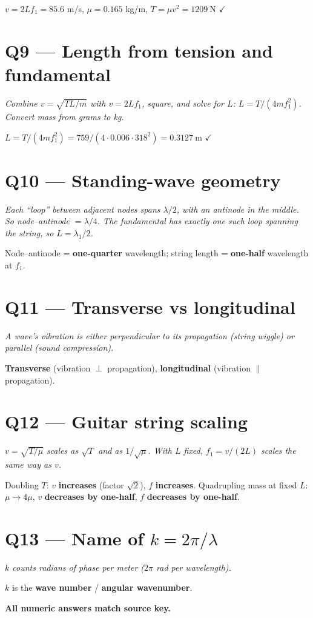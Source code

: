 \documentclass[11pt]{article}
\newcommand{\checkmk}{\ensuremath{\checkmark}}
\begin{document}
$v = 2Lf_1 = 85.6$ m/s, $\mu = 0.165$ kg/m, $T = \mu v^2 = \boxed{1209\ \text{N}}$ \checkmk

\section*{Q9 --- Length from tension and fundamental}
\emph{Combine $v = \sqrt{TL/m}$ with $v = 2Lf_1$, square, and solve for $L$: $L = T/(4 m f_1^2)$. Convert mass from grams to kg.}

$L = T/(4mf_1^2) = 759/(4\cdot 0.006\cdot 318^2) = \boxed{0.3127\ \text{m}}$ \checkmk

\section*{Q10 --- Standing-wave geometry}
\emph{Each ``loop'' between adjacent nodes spans $\lambda/2$, with an antinode in the middle. So node--antinode $= \lambda/4$. The fundamental has exactly one such loop spanning the string, so $L = \lambda_1/2$.}

Node--antinode = \textbf{one-quarter} wavelength; string length = \textbf{one-half} wavelength at $f_1$.

\section*{Q11 --- Transverse vs longitudinal}
\emph{A wave's vibration is either perpendicular to its propagation (string wiggle) or parallel (sound compression).}

\textbf{Transverse} (vibration $\perp$ propagation), \textbf{longitudinal} (vibration $\parallel$ propagation).

\section*{Q12 --- Guitar string scaling}
\emph{$v = \sqrt{T/\mu}$ scales as $\sqrt{T}$ and as $1/\sqrt{\mu}$. With $L$ fixed, $f_1 = v/(2L)$ scales the same way as $v$.}

Doubling $T$: $v$ \textbf{increases} (factor $\sqrt2$), $f$ \textbf{increases}. Quadrupling mass at fixed $L$: $\mu \to 4\mu$, $v$ \textbf{decreases by one-half}, $f$ \textbf{decreases by one-half}.

\section*{Q13 --- Name of $k = 2\pi/\lambda$}
\emph{$k$ counts radians of phase per meter ($2\pi$ rad per wavelength).}

$k$ is the \textbf{wave number} / \textbf{angular wavenumber}.

\bigskip\noindent\textbf{All numeric answers match source key.}
\end{document}
